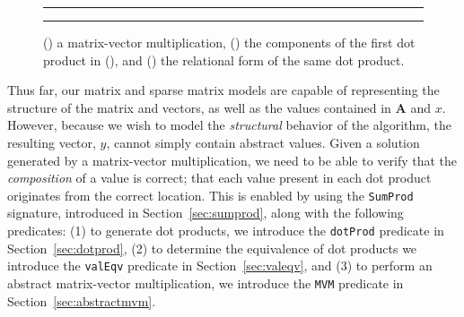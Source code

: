 \documentclass[sigconf]{acmart}
\begin{document}
\begin{figure}
\begin{subfigure}[b]{0.5\textwidth}
  \centering
  
  \caption{}
  \label{fig:mvm}
\end{subfigure}
{\color{lightgray}\rule{0.4\textwidth}{0.1pt}}
\par\bigskip
\begin{subfigure}[b]{0.5\textwidth}
  \centering
  
  \caption{}
  \label{fig:dp}
\end{subfigure}
{\color{lightgray}\rule{0.4\textwidth}{0.1pt}}
\par\bigskip
\begin{subfigure}[b]{0.5\textwidth}
  \centering
  
  \caption{}
  \label{fig:dpt}
\end{subfigure}
\caption{() a matrix-vector multiplication, () the components of the first dot product in (), and () the relational form of the same dot product.}
\end{figure}

Thus far, our matrix and sparse matrix models are capable of representing the structure of the matrix and vectors, as well as the values contained in $\bm{A}$ and $x$.  However, because we wish to model the \emph{structural} behavior of the algorithm, the resulting vector, $y$, cannot simply contain abstract values.  Given a solution generated by a matrix-vector multiplication, we need to be able to verify that the \emph{composition} of a value is correct; that each value present in each dot product originates from the correct location.
This is enabled by using the \texttt{SumProd} signature, introduced in Section~\ref{sec:sumprod}, along with the following predicates:
(1) to generate dot products, we introduce the \texttt{dotProd} predicate in Section~\ref{sec:dotprod}, (2) to determine the equivalence of dot products we introduce the \texttt{valEqv} predicate in Section~\ref{sec:valeqv}, and (3) to perform an abstract matrix-vector multiplication, we introduce the \texttt{MVM} predicate in Section~\ref{sec:abstractmvm}.
\end{document}
